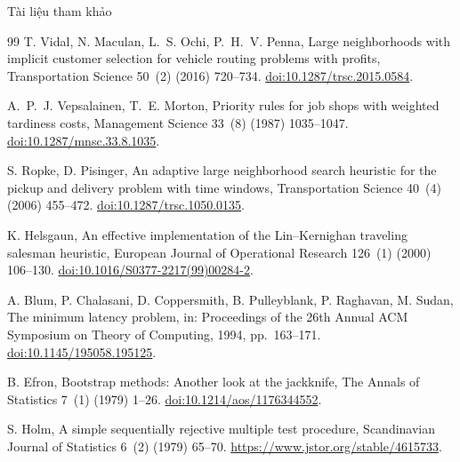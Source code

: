 \documentclass[aspectratio=169,10pt,t,xcolor={table}]{beamer}
\newif\ifmaindividers \maindividerstrue
\begin{document}
\begin{frame}[allowframebreaks]{Tài liệu tham khảo}
\begin{thebibliography}{99}
T. Vidal, N. Maculan, L.~S. Ochi, P.~H.~V. Penna,
Large neighborhoods with implicit customer selection for vehicle routing problems with profits,
Transportation Science 50~(2) (2016) 720--734.
\href{https://doi.org/10.1287/trsc.2015.0584}{doi:10.1287/trsc.2015.0584}.

A.~P.~J. Vepsalainen, T.~E. Morton,
Priority rules for job shops with weighted tardiness costs,
Management Science 33~(8) (1987) 1035--1047.
\href{https://doi.org/10.1287/mnsc.33.8.1035}{doi:10.1287/mnsc.33.8.1035}.

S. Ropke, D. Pisinger,
An adaptive large neighborhood search heuristic for the pickup and delivery problem with time windows,
Transportation Science 40~(4) (2006) 455--472.
\href{https://doi.org/10.1287/trsc.1050.0135}{doi:10.1287/trsc.1050.0135}.

K. Helsgaun,
An effective implementation of the Lin--Kernighan traveling salesman heuristic,
European Journal of Operational Research 126~(1) (2000) 106--130.
\href{https://doi.org/10.1016/S0377-2217(99)00284-2}{doi:10.1016/S0377-2217(99)00284-2}.

A. Blum, P. Chalasani, D. Coppersmith, B. Pulleyblank, P. Raghavan, M. Sudan,
The minimum latency problem,
in: Proceedings of the 26th Annual ACM Symposium on Theory of Computing, 1994, pp.~163--171.
\href{https://doi.org/10.1145/195058.195125}{doi:10.1145/195058.195125}.

B. Efron,
Bootstrap methods: Another look at the jackknife,
The Annals of Statistics 7~(1) (1979) 1--26.
\href{https://doi.org/10.1214/aos/1176344552}{doi:10.1214/aos/1176344552}.

S. Holm,
A simple sequentially rejective multiple test procedure,
Scandinavian Journal of Statistics 6~(2) (1979) 65--70.
\url{https://www.jstor.org/stable/4615733}.
\end{thebibliography}
\end{frame}
\begin{frame}
\end{frame}
\appendix
\maindividersfalse
\end{document}
